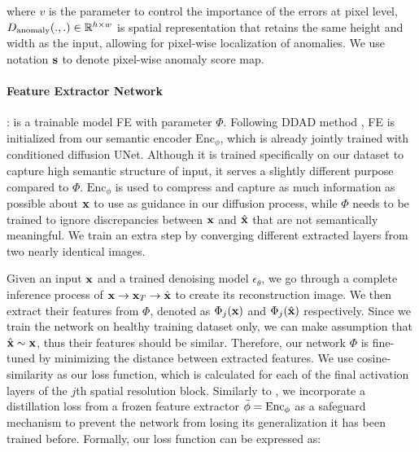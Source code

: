 where $v$ is the parameter to control the importance of the errors at pixel level, $D_{\textnormal{anomaly}}(., .) \in {\mathbb{R}}^{h \times w}$ is spatial representation that retains the same height and width as the input, allowing for pixel-wise localization of anomalies. We use notation ${\mathbf{s}}$ to denote pixel-wise anomaly score map.  

\paragraph{Feature Extractor Network}: is a trainable model \textrm{FE} with parameter $\Phi$. Following DDAD method \cite{DDAD}, \textrm{FE} is initialized from our semantic encoder $\mathrm{Enc}_{\phi}$, which is already jointly trained with conditioned diffusion UNet. Although it is trained specifically on our dataset to capture high semantic structure of input, it serves a slightly different purpose compared to $\Phi$. $\mathrm{Enc}_{\phi}$ is used to compress and capture as much information as possible about ${\mathbf{x}}$ to use as guidance in our diffusion process, while $\Phi$ needs to be trained to ignore discrepancies between ${\mathbf{x}}$ and $\hat{{\mathbf{x}}}$ that are not semantically meaningful. We train an extra step by converging different extracted layers from two nearly identical images.

Given an input ${\mathbf{x}}$ and a trained denoising model $\epsilon_{\theta}$, we go through a complete inference process of ${\mathbf{x}} \to {\mathbf{x}}_{T} \to \hat{{\mathbf{x}}}$ to create its reconstruction image. We then extract their features from $\Phi$, denoted as $\Phi_j ({\mathbf{x}})$ and $\Phi_j (\hat{{\mathbf{x}}})$ respectively. Since we train the network on healthy training dataset only, we can make assumption that $\hat{{\mathbf{x}}} \sim {\mathbf{x}}$, thus their features should be similar. Therefore, our network $\Phi$ is fine-tuned by minimizing the distance between extracted features. We use cosine-similarity as our loss function, which is calculated for each of the final activation layers of the $j$th spatial resolution block. Similarly to \cite{DDAD}, we incorporate a distillation loss from a frozen feature extractor $\bar\phi = \textnormal{Enc}_{\phi}$ as a safeguard mechanism to prevent the network from losing its generalization it has been trained before. Formally, our loss function can be expressed as: 

